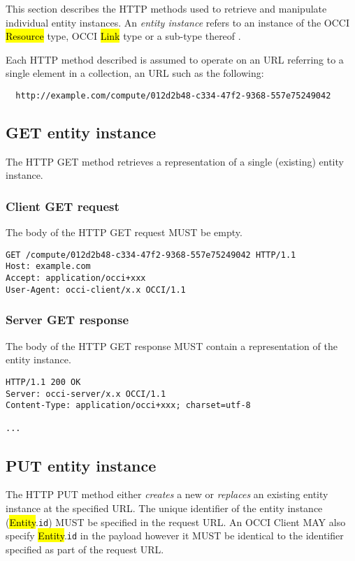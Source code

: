 \documentclass[10pt,a4paper]{article}
\begin{document}
This section describes the HTTP methods used to retrieve and manipulate
individual entity instances. An {\em entity instance} refers to an instance
of the OCCI \hl{Resource} type, OCCI \hl{Link} type or a sub-type thereof
\cite{occi:core}.

Each HTTP method described is assumed to operate
on an URL referring to a single element in a collection, an URL such as the
following:
\begin{verbatim}
  http://example.com/compute/012d2b48-c334-47f2-9368-557e75249042
\end{verbatim}


\subsection{GET entity instance}
The HTTP GET method retrieves a representation of a single (existing)
entity instance.

\subsubsection{Client GET request}
The body of the HTTP GET request MUST be empty.
\begin{verbatim}
GET /compute/012d2b48-c334-47f2-9368-557e75249042 HTTP/1.1
Host: example.com
Accept: application/occi+xxx
User-Agent: occi-client/x.x OCCI/1.1
\end{verbatim}

\subsubsection{Server GET response}
The body of the HTTP GET response MUST contain a representation of the entity
instance.
\begin{verbatim}
HTTP/1.1 200 OK
Server: occi-server/x.x OCCI/1.1
Content-Type: application/occi+xxx; charset=utf-8

...
\end{verbatim}


\subsection{PUT entity instance}
The HTTP PUT method either {\em creates} a new or {\em replaces} an existing
entity instance at the specified URL.
%
The unique identifier of the entity instance (\hl{Entity}.{\tt id}) MUST be
specified in the request URL.
An OCCI Client MAY also specify \hl{Entity}.{\tt id} in the payload however it
MUST be identical to the identifier specified as part of the request URL.
\end{document}
